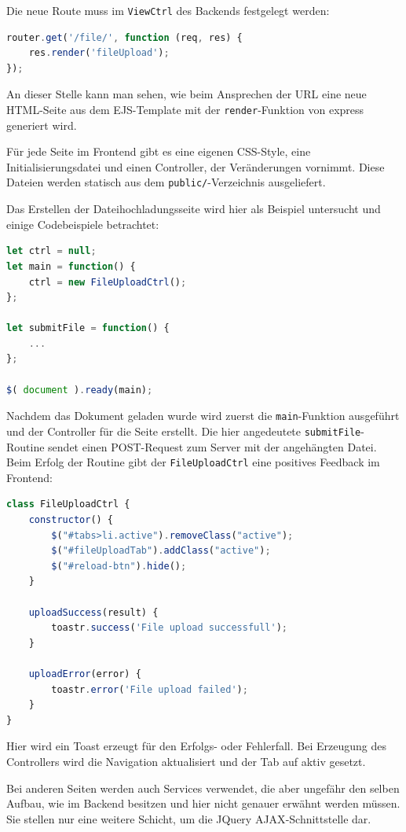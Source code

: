 Die neue Route muss im \lstinline|ViewCtrl| des Backends festgelegt werden:\\

\begin{lstlisting}[language=JavaScript, caption=Definition einer neuen Frontendroute in der viewCtrl.js]
router.get('/file/', function (req, res) {
	res.render('fileUpload');
});
\end{lstlisting}

An dieser Stelle kann man sehen, wie beim Ansprechen der URL eine neue HTML-Seite aus dem EJS-Template mit der \lstinline|render|-Funktion von express generiert wird.

Für jede Seite im Frontend gibt es eine eigenen CSS-Style, eine Initialisierungsdatei und einen Controller, der Veränderungen vornimmt. Diese Dateien werden statisch aus dem \lstinline|public/|-Verzeichnis ausgeliefert.

Das Erstellen der Dateihochladungsseite wird hier als Beispiel untersucht und einige Codebeispiele betrachtet: \\

\begin{lstlisting}[language=JavaScript, caption=Initalisierungsfunktion der Uploadseite in der fileUpload.js]
let ctrl = null;
let main = function() {
	ctrl = new FileUploadCtrl();
};

let submitFile = function() {
	...
};

$( document ).ready(main);
\end{lstlisting}

Nachdem das Dokument geladen wurde wird zuerst die \lstinline|main|-Funktion ausgeführt und der Controller für die Seite erstellt. Die hier angedeutete \lstinline|submitFile|-Routine sendet einen POST-Request zum Server mit der angehängten Datei. Beim Erfolg der Routine gibt der \lstinline|FileUploadCtrl| eine positives Feedback im Frontend:\\

\begin{lstlisting}[language=JavaScript, caption=Initalisierungsfunktion der Uploadseite in der fileUpload.js]
class FileUploadCtrl {
	constructor() {
		$("#tabs>li.active").removeClass("active");
		$("#fileUploadTab").addClass("active");
		$("#reload-btn").hide();
	}

	uploadSuccess(result) {
		toastr.success('File upload successfull');
	}

	uploadError(error) {
		toastr.error('File upload failed');
	}
}        
\end{lstlisting}

Hier wird ein Toast erzeugt für den Erfolgs- oder Fehlerfall. Bei Erzeugung des Controllers wird die Navigation aktualisiert und der Tab auf aktiv gesetzt.

Bei anderen Seiten werden auch Services verwendet, die aber ungefähr den selben Aufbau, wie im Backend besitzen und hier nicht genauer erwähnt werden müssen. Sie stellen nur eine weitere Schicht, um die JQuery \gls{AJAX}-Schnittstelle dar.